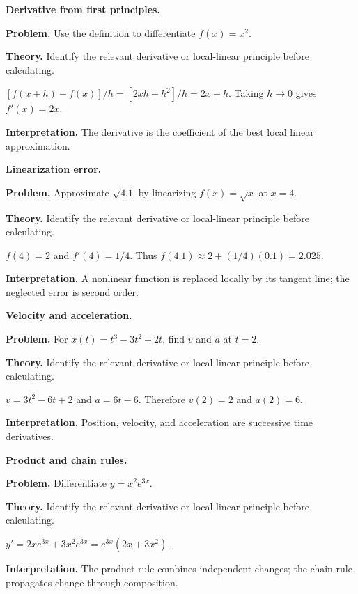 \begin{workedexample}
\textbf{Derivative from first principles.}\par
\textbf{Problem.} Use the definition to differentiate $f(x)=x^2$.

\textbf{Theory.} Identify the relevant derivative or local-linear principle before calculating.

\begin{solution}
$[f(x+h)-f(x)]/h=[2xh+h^2]/h=2x+h$.  Taking $h\to0$ gives $f'(x)=2x$.

\textbf{Interpretation.} The derivative is the coefficient of the best local linear approximation.
\end{solution}
\end{workedexample}

\begin{workedexample}
\textbf{Linearization error.}\par
\textbf{Problem.} Approximate $\sqrt{4.1}$ by linearizing $f(x)=\sqrt{x}$ at $x=4$.

\textbf{Theory.} Identify the relevant derivative or local-linear principle before calculating.

\begin{solution}
$f(4)=2$ and $f'(4)=1/4$. Thus $f(4.1)\approx2+(1/4)(0.1)=2.025$.

\textbf{Interpretation.} A nonlinear function is replaced locally by its tangent line; the neglected error is second order.
\end{solution}
\end{workedexample}

\begin{workedexample}
\textbf{Velocity and acceleration.}\par
\textbf{Problem.} For $x(t)=t^3-3t^2+2t$, find $v$ and $a$ at $t=2$.

\textbf{Theory.} Identify the relevant derivative or local-linear principle before calculating.

\begin{solution}
$v=3t^2-6t+2$ and $a=6t-6$. Therefore $v(2)=2$ and $a(2)=6$.

\textbf{Interpretation.} Position, velocity, and acceleration are successive time derivatives.
\end{solution}
\end{workedexample}

\begin{workedexample}
\textbf{Product and chain rules.}\par
\textbf{Problem.} Differentiate $y=x^2e^{3x}$.

\textbf{Theory.} Identify the relevant derivative or local-linear principle before calculating.

\begin{solution}
$y'=2xe^{3x}+3x^2e^{3x}=e^{3x}(2x+3x^2)$.

\textbf{Interpretation.} The product rule combines independent changes; the chain rule propagates change through composition.
\end{solution}
\end{workedexample}

